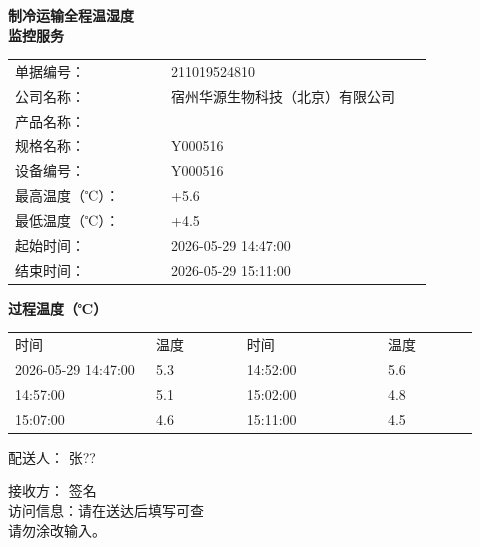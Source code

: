 \documentclass[UTF8,10pt,a4paper,fontset=fandol]{ctexart}
\newcommand{\fieldvalue}[1]{#1}
\newcommand{\handwritten}[1]{#1}
\begin{document}
\hfill
\begin{minipage}[t]{0.47\linewidth}
\centering
\textbf{制冷运输全程温湿度}\\
\textbf{监控服务}

\medskip
\noindent
\scriptsize
\begin{tabular}{@{}p{0.34\linewidth}p{0.58\linewidth}@{}}
单据编号：&
\fieldvalue{211019524810}\\
公司名称：&
\fieldvalue{宿州华源生物科技（北京）有限公司}\\
产品名称：&
\fieldvalue{\text{（字迹模糊）}}\\
规格名称：&
\fieldvalue{Y000516}\\
设备编号：&
\fieldvalue{Y000516}\\
最高温度（℃）：&
\fieldvalue{+5.6}\\
最低温度（℃）：&
\fieldvalue{+4.5}\\
起始时间：&
\fieldvalue{2026-05-29 14:47:00}\\
结束时间：&
\fieldvalue{2026-05-29 15:11:00}\\
\end{tabular}

\medskip
\textbf{过程温度（℃）}

\begin{tabular}{@{}p{0.28\linewidth}p{0.18\linewidth}p{0.28\linewidth}p{0.18\linewidth}@{}}
时间&温度&时间&温度\\
2026-05-29 14:47:00&
\fieldvalue{5.3}&
14:52:00&
\fieldvalue{5.6}\\
14:57:00&
\fieldvalue{5.1}&
15:02:00&
\fieldvalue{4.8}\\
15:07:00&
\fieldvalue{4.6}&
15:11:00&
\fieldvalue{4.5}\\
\end{tabular}

\medskip
配送人：%
\fieldvalue{\handwritten{张??}}

\medskip
接收方：%
\fieldvalue{\handwritten{签名}}\\[1ex]

访问信息：请在送达后填写可查\\
请勿涂改输入。
\end{minipage}
\end{document}
